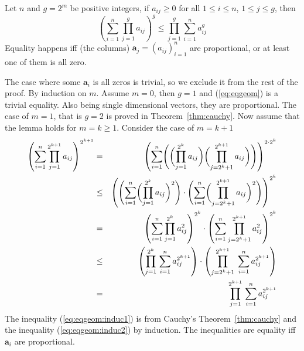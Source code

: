 \begin{lem} \label{lem:eqgeom}
Let $n$ and $g=2^m$ be positive integers,
if \(a_{ij}\geq 0\)
for all \(1\leq i \leq n\), \(1\leq j \leq g\),
then
\begin{equation} \label{eq:eqgeom}
 \left(\sum_{i=1}^n \prod_{j=1}^g a_{ij}\right)^g
 \leq
 \prod_{j=1}^g \sum_{i=1}^n a_{ij}^g
\end{equation}
Equality happens iff (the columns)
\(\mathbf{a}_j = (a_{ij})_{i=1}^n\) are proportional, or at least
one of them is all zero.
\end{lem}
\begin{thmproof}
The case where some \(\mathbf{a}_i\) is all zeros is trivial,
so we exclude it from the rest of the proof.
By induction on $m$.
Assume \(m=0\), then \(g=1\) and (\ref{eq:eqgeom}) is a trivial equality.
Also being single dimensional vectors, they are proportional.
The case of \(m=1\), that is \(g=2\) is proved in Theorem~\ref{thm:cauchy}.
Now assume that the lemma holds for \(m=k\geq 1\).
Consider the case of \(m=k+1\)
\begin{eqnarray}
 \left(\sum_{i=1}^{n} \prod_{j=1}^{2^{k+1}} a_{ij}\right)^{2^{k+1}}
 &=& \notag
 \left(\sum_{i=1}^{n}
       \Biggl(
       \biggl(\prod_{j=1}^{2^k} a_{ij}\biggr)
       \biggl(\prod_{j=2^k + 1}^{2^{k+1}} a_{ij}\biggr)
       \Biggr)
 \right)^{2\cdot 2^k} \\
 &\leq& \label{eq:eqgeom:induc1}
 \left(
 \Biggl(\sum_{i=1}^{n}
       \biggl(\prod_{j=1}^{2^k} a_{ij}\biggr)^2
 \Biggr)
 \cdot
 \Biggl(\sum_{i=1}^{n}
       \biggl(\prod_{j=2^k+1}^{2^{k+1}} a_{ij}\biggr)^2
 \Biggr)
 \right)^{2^k} \\
 &=& \notag
 \left(\sum_{i=1}^{n}
       \prod_{j=1}^{2^k} a_{ij}^2
 \right)^{2^k}
 \cdot
 \left(\sum_{i=1}^{n}
       \prod_{j=2^k+1}^{2^{k+1}} a_{ij}^2
 \right) ^{2^k}
 \\
 &\leq& \label{eq:eqgeom:induc2}
 \left(\prod_{j=1}^{2^k} \,\sum_{i=1}^n a_{ij}^{2^{k+1}}\right)
 \cdot
 \left(\prod_{j=2^k+1}^{2^{k+1}} \;\sum_{i=1}^n a_{ij}^{2^{k+1}}\right) \\
 &=& \notag
 \prod_{j=1}^{2^{k+1}} \,\sum_{i=1}^n a_{ij}^{2^{k+1}}
\end{eqnarray}
The inequality (\ref{eq:eqgeom:induc1}) is from Cauchy's Theorem~\ref{thm:cauchy}
and the inequality (\ref{eq:eqgeom:induc2}) by induction.
The inequalities are equality iff \(\mathbf{a}_i\) are proportional.
\end{thmproof}

